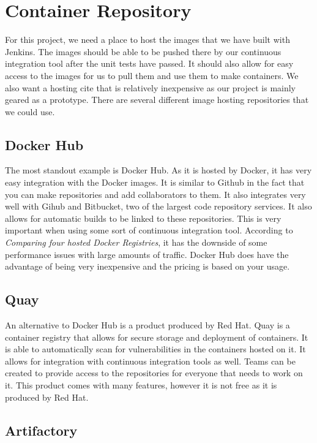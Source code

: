 \documentclass[onecolumn, draftclsnofoot,10pt, compsoc]{IEEEtran}
\begin{document}
\section{Container Repository}
For this project, we need a place to host the images that we have built with Jenkins. The images should be able to be pushed there by our continuous integration tool after the unit tests have passed. It should also allow for easy access to the images for us to pull them and use them to make containers. We also want a hosting cite that is relatively inexpensive as our project is mainly geared as a prototype. There are several different image hosting repositories that we could use. 

\subsection{Docker Hub}
The most standout example is Docker Hub. As it is hosted by Docker, it has very easy integration with the Docker images. It is similar to Github in the fact that you can make repositories and add collaborators to them. It also integrates very well with Gihub and Bitbucket, two of the largest code repository services. It also allows for automatic builds to be linked to these repositories. This is very important when using some sort of continuous integration tool. According to \textit{Comparing four hosted Docker Registries}, it has the downside of some performance issues with large amounts of traffic.\cite{docker_hosting} Docker Hub does have the advantage of being very inexpensive and the pricing is based on your usage. 

\subsection{Quay}
An alternative to Docker Hub is a product produced by Red Hat. Quay is a container registry that allows for secure storage and deployment of containers. It is able to automatically scan for vulnerabilities in the containers hosted on it. It allows for integration with continuous integration tools as well. Teams can be created to provide access to the repositories for everyone that needs to work on it. This product comes with many features, however it is not free as it is produced by Red Hat.\cite{quay}

\subsection{Artifactory}
\end{document}
